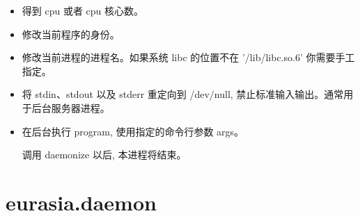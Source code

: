 \documentclass{manual}
\begin{document}
\begin{itemize}

\item {}

得到 cpu 或者 cpu 核心数。

\item {}

修改当前程序的身份。

\item {}

修改当前进程的进程名。如果系统 libc 的位置不在 '/lib/libc.so.6' 你需要手工指定。


\item {}

将 stdin、stdout 以及 stderr 重定向到 /dev/null, 禁止标准输入输出。通常用于后台服务器进程。

\item {}

在后台执行 program, 使用指定的命令行参数 args。

调用 daemonize 以后, 本进程将结束。

\end{itemize}

\section{eurasia.daemon}


\end{document}
